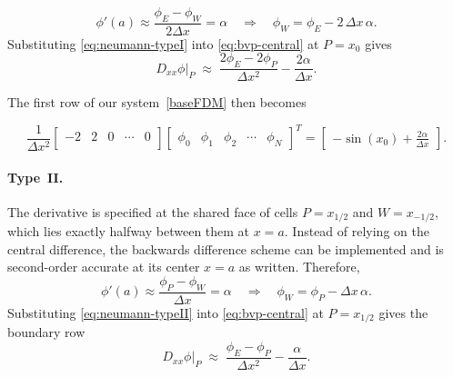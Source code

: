 \begin{equation}
    \phi'(a) \approx \frac{\phi_E - \phi_W}{2\Delta x} = \alpha
    \quad\Longrightarrow\quad
    \phi_W = \phi_E - 2\,\Delta x\,\alpha .
    \label{eq:neumann-typeI}
\end{equation}
Substituting \eqref{eq:neumann-typeI} into
\eqref{eq:bvp-central} at $P = x_0$ gives
\begin{equation}
    D_{xx}\phi\big|_P
    \;\approx\;
    \frac{2\phi_E - 2\phi_P}{\Delta x^2} - \frac{2\alpha}{\Delta x}.
    \label{eq:neumann-typeI-row}
\end{equation}

\noindent The first row of our system~\eqref{baseFDM} then becomes

\begin{equation}
    \frac{1}{\Delta x^2}
    \begin{bmatrix}
        -2& 2 & 0 & \cdots & 0\\
    \end{bmatrix}
    \begin{bmatrix}
        \phi_0 & \phi_1 & \phi_2 &  \cdots  & \phi_N
    \end{bmatrix}^T
    =
    \begin{bmatrix}
        -\sin(x_0) + \frac{2\alpha}{\Delta x}
    \end{bmatrix}. \label{neuTypeI}
\end{equation}

\paragraph{Type~II.} The derivative is specified at the shared face of cells $P = x_{1/2}$ and $W = x_{-1/2}$, which lies
exactly halfway between them at $x = a$. Instead of relying on the central difference, the backwards difference scheme can be implemented and is
second-order accurate at its center $x = a$ as written. Therefore,
\begin{equation}
    \phi'(a) \approx \frac{\phi_P - \phi_W}{\Delta x} = \alpha
    \quad\Longrightarrow\quad
    \phi_W = \phi_P - \Delta x\,\alpha .
    \label{eq:neumann-typeII}
\end{equation}
Substituting \eqref{eq:neumann-typeII} into
\eqref{eq:bvp-central} at $P = x_{1/2}$ gives the boundary row
\begin{equation}
    D_{xx}\phi\big|_P
    \;\approx\;
    \frac{\phi_E - \phi_P}{\Delta x^2} - \frac{\alpha}{\Delta x}.
    \label{eq:neumann-typeII-row}
\end{equation}

